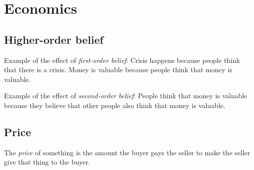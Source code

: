 \chapter{Economics}

\section{Higher-order belief}

%
%
%
%
Example of the effect of \emph{first-order belief}:
Crisis happens because people think that there is a crisis.
Money is valuable because people think that money is valuable.

%
%
%
Example of the effect of \emph{second-order belief}:
People think that money is valuable because
they believe that other people also think that money is valuable.

\section{Price}

The \emph{price} of something is the amount the buyer
pays the seller to make the seller give that thing to the buyer.
